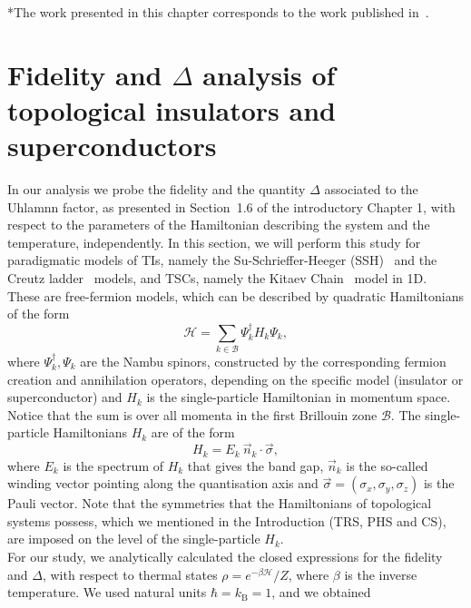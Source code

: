 \vfill

\begin{center}
 *The work presented in this chapter corresponds to the work published in~\cite{mer:vla:pau:vie:17}.
\end{center}

\newpage




\section{Fidelity and $\Delta$ analysis of topological insulators and superconductors}
\label{sec:topo}
In our analysis we probe the fidelity and the quantity $\Delta$ associated to the Uhlamnn factor, as presented in Section~1.6 of the introductory Chapter 1, with respect to the parameters of the Hamiltonian describing the system and the temperature, independently. In this section, we will perform this study for paradigmatic models of TIs, namely the Su-Schrieffer-Heeger (SSH)~\cite{su:sch:hee:79} and the Creutz ladder~\cite{cre:99,ber:pat:ami:del:09} models, and TSCs, namely the Kitaev Chain~\cite{kit:cha:01} model in 1D. \\
These are free-fermion models, which can be described by quadratic Hamiltonians of the form
\begin{equation}
\mathcal{H}=\sum_{k\in\mathcal{B}}\Psi_k^\dagger H_k \Psi_k,
\end{equation}
where $\Psi_k^\dagger,\Psi_k$ are the Nambu spinors, constructed by the corresponding fermion creation and annihilation operators, depending on the specific model (insulator or superconductor) and $H_k$ is the single-particle Hamiltonian in momentum space. Notice that the sum is over all momenta in the first Brillouin zone $\mathcal{B}$. The single-particle Hamiltonians $H_k$ are of the form
\begin{equation}
H_k=E_k\ \vec{n}_k\cdot\vec{\sigma},
\end{equation}
where $E_k$ is the spectrum of $H_k$ that gives the band gap, $\vec{n}_k$ is the so-called winding vector pointing along the quantisation axis and $\vec{\sigma}=(\sigma_x,\sigma_y,\sigma_z)$ is the Pauli vector. Note that the symmetries that the Hamiltonians of topological systems possess, which we mentioned in the Introduction (TRS, PHS and CS), are imposed on the level of the single-particle $H_k$.\\
For our study, we analytically calculated the closed expressions for the fidelity and $\Delta$, with respect to thermal states $\rho=e^{-\beta \mathcal{H}}/Z$, where $\beta$ is the inverse temperature.  We used natural units $\hbar=k_{\text{B}}=1$, and we obtained

